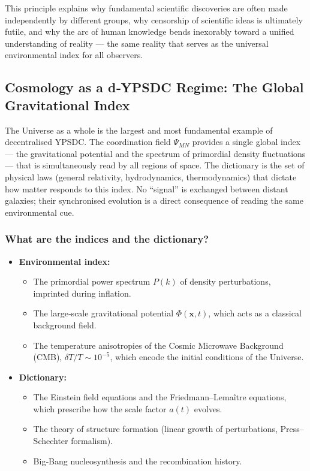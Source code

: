 \documentclass[11pt,a4paper]{article}
\begin{document}
This principle explains why fundamental scientific discoveries are often
made independently by different groups, why censorship of scientific
ideas is ultimately futile, and why the arc of human knowledge bends
inexorably toward a unified understanding of reality — the same reality
that serves as the universal environmental index for all observers.

\subsection{Cosmology as a d‑YPSDC Regime: The Global Gravitational Index}
\label{subsec:cosmology-dypsdc}

The Universe as a whole is the largest and most fundamental example of
decentralised YPSDC.  The coordination field \(\Psi_{MN}\) provides a
single global index — the gravitational potential and the spectrum of
primordial density fluctuations — that is simultaneously read by all
regions of space.  The dictionary is the set of physical laws (general
relativity, hydrodynamics, thermodynamics) that dictate how matter
responds to this index.  No ``signal'' is exchanged between distant
galaxies; their synchronised evolution is a direct consequence of
reading the same environmental cue.

\subsubsection*{What are the indices and the dictionary?}
\begin{itemize}[leftmargin=*]
	\item \textbf{Environmental index:}
	\begin{itemize}
		\item The primordial power spectrum \(P(k)\) of density
		perturbations, imprinted during inflation.
		\item The large‑scale gravitational potential \(\Phi(\mathbf{x},t)\),
		which acts as a classical background field.
		\item The temperature anisotropies of the Cosmic Microwave
		Background (CMB), \(\delta T / T \sim 10^{-5}\), which encode
		the initial conditions of the Universe.
	\end{itemize}
	\item \textbf{Dictionary:}
	\begin{itemize}
		\item The Einstein field equations and the Friedmann–Lemaître
		equations, which prescribe how the scale factor \(a(t)\) evolves.
		\item The theory of structure formation (linear growth of
		perturbations, Press–Schechter formalism).
		\item Big‑Bang nucleosynthesis and the recombination history.
	\end{itemize}
\end{itemize}
\end{document}
